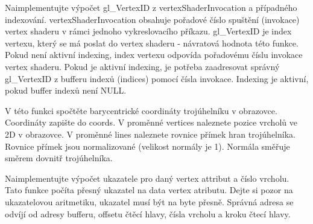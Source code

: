 
\begin{DoxyRefList}
\item[\label{todo__todo000003}%
\hypertarget{todo__todo000003}{}%
Global \hyperlink{group__gpu__side_ga3983ddd2c559c1a6d1e1f1f37be3eae0}{gpu\-\_\-compute\-G\-L\-Vertex\-I\-D} (Vertex\-Index const $\ast$const indices, Vertex\-Shader\-Invocation const vertex\-Shader\-Invocation)]Naimplementujte výpočet gl\-\_\-\-Vertex\-I\-D z vertex\-Shader\-Invocation a případného indexování. vertex\-Shader\-Invocation obsahuje pořadové číslo spuštění (invokace) vertex shaderu v rámci jednoho vykreslovacího příkazu. gl\-\_\-\-Vertex\-I\-D je index vertexu, který se má poslat do vertex shaderu -\/ návratová hodnota této funkce. Pokud není aktivní indexing, index vertexu odpovída pořadovému číslu invokace vertex shaderu. Pokud je aktivní indexing, je potřeba zaadresovat správný gl\-\_\-\-Vertex\-I\-D z bufferu indexů (indices) pomocí čísla invokace. Indexing je aktivní, pokud buffer indexů není N\-U\-L\-L.  
\item[\label{todo__todo000007}%
\hypertarget{todo__todo000007}{}%
Global \hyperlink{group__gpu__side_gad1769dca11910a684a6ddaad188f3e3d}{gpu\-\_\-compute\-Screen\-Space\-Barycentrics} (\hyperlink{structVec3}{Vec3} $\ast$const coords, \hyperlink{structVec2}{Vec2} const $\ast$const pixel\-Center, \hyperlink{structVec2}{Vec2} const vertices\mbox{[}V\-E\-R\-T\-I\-C\-E\-S\-\_\-\-P\-E\-R\-\_\-\-T\-R\-I\-A\-N\-G\-L\-E\mbox{]}, \hyperlink{structVec3}{Vec3} const lines\mbox{[}E\-D\-G\-E\-S\-\_\-\-P\-E\-R\-\_\-\-T\-R\-I\-A\-N\-G\-L\-E\mbox{]})]V této funkci spočtěte barycentrické coordináty trojúhelníku v obrazovce. Coordináty zapište do coords. V proměnné vertices naleznete pozice vrcholů ve 2\-D v obrazovce. V proměnné lines naleznete rovnice přímek hran trojúhelníka. Rovnice přímek jsou normalizované (velikost normály je 1). Normála směřuje směrem dovnitř trojúhelníka.  
\item[\label{todo__todo000004}%
\hypertarget{todo__todo000004}{}%
Global \hyperlink{group__gpu__side_ga4b894f26ed3c06346da10fc6c41f90eb}{gpu\-\_\-compute\-Vertex\-Attribute\-Data\-Pointer} (\hyperlink{structGPUVertexPullerHead}{G\-P\-U\-Vertex\-Puller\-Head} const $\ast$const head, Vertex\-Index const gl\-\_\-\-Vertex\-I\-D)]Naimplementujte výpočet ukazatele pro daný vertex attribut a číslo vrcholu. Tato funkce počíta přesný ukazatel na data vertex atributu. Dejte si pozor na ukazatelovou aritmetiku, ukazatel musí být na byte přesně. Správná adresa se odvíjí od adresy bufferu, offsetu čtěcí hlavy, čísla vrcholu a kroku čtecí hlavy.  

\end{DoxyRefList}

